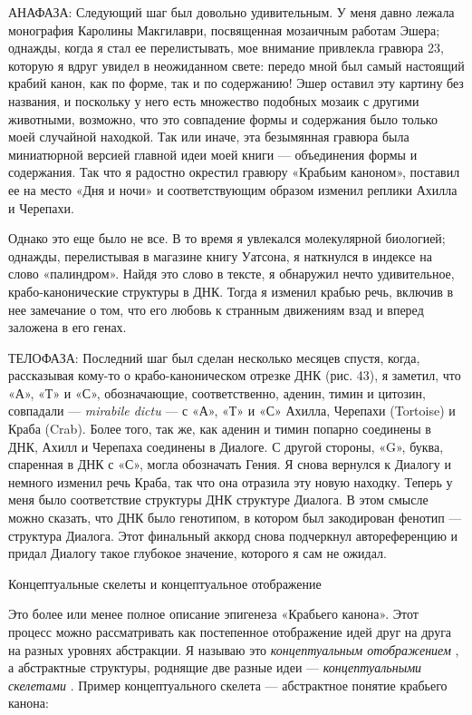 \documentclass[../main.tex]{subfiles}
\begin{document}
АНАФАЗА: Следующий шаг был довольно удивительным. У меня давно лежала монография Каролины Макгилаври, посвященная мозаичным работам Эшера; однажды, когда я стал ее перелистывать, мое внимание привлекла гравюра 23, которую я вдруг увидел в неожиданном свете: передо мной был самый настоящий крабий канон, как по форме, так и по содержанию! Эшер оставил эту картину без названия, и поскольку у него есть множество подобных мозаик с другими животными, возможно, что это совпадение формы и содержания было только моей случайной находкой. Так или иначе, эта безымянная гравюра была миниатюрной версией главной идеи моей книги --- объединения формы и содержания. Так что я радостно окрестил гравюру «Крабьим каноном», поставил ее на место «Дня и ночи» и соответствующим образом изменил реплики Ахилла и Черепахи.

Однако это еще было не все. В то время я увлекался молекулярной биологией; однажды, перелистывая в магазине книгу Уатсона, я наткнулся в индексе на слово «палиндром». Найдя это слово в тексте, я обнаружил нечто удивительное, крабо-канонические структуры в ДНК. Тогда я изменил крабью речь, включив в нее замечание о том, что его любовь к странным движениям взад и вперед заложена в его генах.

ТЕЛОФАЗА: Последний шаг был сделан несколько месяцев спустя, когда, рассказывая кому-то о крабо-каноническом отрезке ДНК (рис. 43), я заметил, что «А», «Т» и «С», обозначающие, соответственно, аденин, тимин и цитозин, совпадали --- \emph{mirabile dictu} --- с «А», «Т» и «С» Ахилла, Черепахи (Tortoise) и Краба (Crab). Более того, так же, как аденин и тимин попарно соединены в ДНК, Ахилл и Черепаха соединены в Диалоге. С другой стороны, «G», буква, спаренная в ДНК с «С», могла обозначать Гения. Я снова вернулся к Диалогу и немного изменил речь Краба, так что она отразила эту новую находку. Теперь у меня было соответствие структуры ДНК структуре Диалога. В этом смысле можно сказать, что ДНК было генотипом, в котором был закодирован фенотип --- структура Диалога. Этот финальный аккорд снова подчеркнул автореференцию и придал Диалогу такое глубокое значение, которого я сам не ожидал.

Концептуальные скелеты и концептуальное отображение

Это более или менее полное описание эпигенеза «Крабьего канона». Этот процесс можно рассматривать как постепенное отображение идей друг на друга на разных уровнях абстракции. Я называю это \emph{концептуальным отображением} , а абстрактные структуры, роднящие две разные идеи --- \emph{концептуальными скелетами} . Пример концептуального скелета --- абстрактное понятие крабьего канона:
\end{document}
